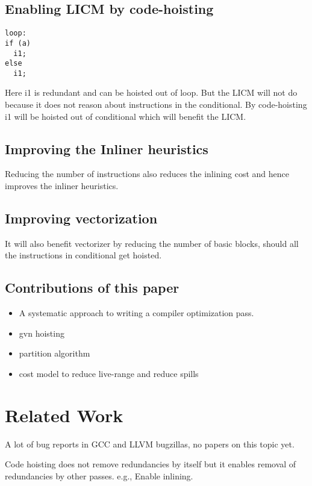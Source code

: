 \documentclass{sig-alternate}
\begin{document}
\subsection{Enabling LICM by code-hoisting}

\begin{verbatim}
loop:
if (a)
  i1;
else
  i1;
\end{verbatim}

Here i1 is redundant and can be hoisted out of loop. But the LICM will
not do because it does not reason about instructions in the
conditional.  By code-hoisting i1 will be hoisted out of conditional
which will benefit the LICM.

\subsection{Improving the Inliner heuristics}
Reducing the number of instructions also reduces the inlining cost and
hence improves the inliner heuristics.

\subsection{Improving vectorization}
It will also benefit vectorizer by reducing the number
of basic blocks, should all the instructions in conditional get hoisted.


\subsection{Contributions of this paper}
\begin{itemize}
\item A systematic approach to writing a compiler optimization pass.
\item gvn hoisting
\item partition algorithm
\item cost model to reduce live-range and reduce spills
\end{itemize}

\section{Related Work}

A lot of bug reports in GCC and LLVM bugzillas, no papers on this topic yet.

Code hoisting does not remove redundancies by itself but it enables
removal of redundancies by other passes.  e.g., Enable inlining.
\end{document}
